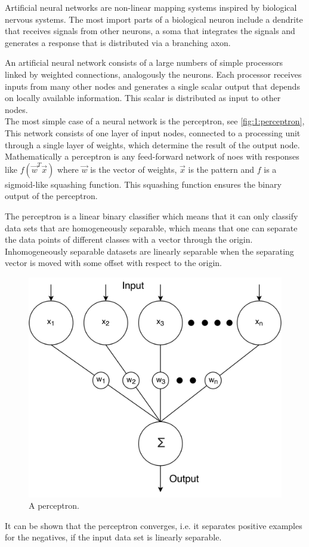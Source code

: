 Artificial neural networks are non-linear mapping systems inspired by biological nervous systems. The most import parts of a biological neuron include a dendrite that receives signals from other neurons, a soma that integrates the signals and generates a response that is distributed via a branching axon. 

An artificial neural network consists of a large numbers of simple processors linked by weighted connections, analogously the neurons. Each processor receives inputs from many other nodes and generates a single scalar output that depends on locally available information. This scalar is distributed as input to other nodes. \\

The most simple case of a neural network is the perceptron, see \autoref{fig:1:perceptron}, This network consists of one layer of input nodes, connected to a processing unit through a single layer of weights, which determine the result of the output node. Mathematically a perceptron is any feed-forward network of noes with responses like $f(\vec{w}^T\vec{x})$ where $\vec{w}$ is the vector of weights, $\vec{x}$ is the pattern and $f$ is a sigmoid-like squashing function\cite{reed1998neural}. This squashing function ensures the binary output of the perceptron. 

The perceptron is a linear binary classifier which means that it can only classify data sets that are homogeneously separable, which means that one can separate the data points of different classes with a vector through the origin. Inhomogeneously separable datasets are linearly separable when the separating vector is moved with some offset with respect to the origin.

\begin{figure}[H]
	\centering
	\includegraphics[width=\columnwidth]{./img/perceptron}
	\caption{A perceptron.}
	\label{fig:1:perceptron}
\end{figure}

It can be shown that the perceptron converges, i.e. it separates positive examples for the negatives, if the input data set is linearly separable. 




